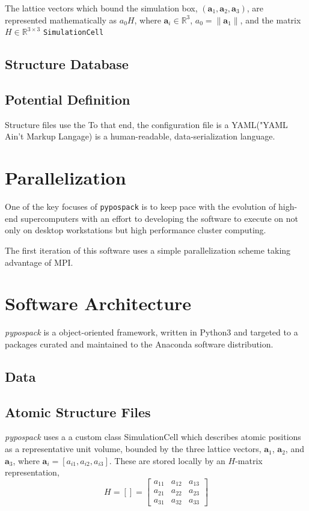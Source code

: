 The lattice vectors which bound the simulation box, $(\bm{a}_1,\bm{a}_2,\bm{a}_3)$,  are represented mathematically as $a_0 H$, where $\bm{a}_i \in \mathbb{R}^3$, $a_0 = \lVert\bm{a}_1\rVert$, and the matrix $H \in \mathbb{R}^{3\times3}$
\verb|SimulationCell|

\subsection{Structure Database}
\subsection{Potential Definition}

Structure files use the 
To that end, the configuration file is a YAML("YAML Ain't Markup Langage) is a human-readable, data-serialization language.


\section{Parallelization}
One of the key focuses of \verb|pypospack| is to keep pace with the evolution of high-end supercomputers with an effort to developing the software to execute on not only on desktop workstations but high performance cluster computing.

The first iteration of this software uses a simple parallelization scheme taking advantage of MPI.
\section{Software Architecture}

\emph{pypospack} is a object-oriented framework, written in Python3 and targeted to a packages curated and maintained to the Anaconda software distribution.

\subsection{Data}
\subsection{Atomic Structure Files}

\emph{pypospack} uses a a custom class SimulationCell which describes atomic positions as a representative unit volume, bounded by the three lattice vectors, $\bm{a}_1$, $\bm{a}_2$, and $\bm{a}_3$, where $\bm{a}_i=[a_{i1},a_{i2},a_{i3}]$.  These are stored locally by an $H$-matrix representation,
\begin{equation}\label{eq:H-matrix}
     H=\left[\right] =
      \begin{bmatrix}
        a_{11}&a_{12}&a_{13}\\
        a_{21}&a_{22}&a_{23}\\
        a_{31}&a_{32}&a_{33}
      \end{bmatrix}
\end{equation}

